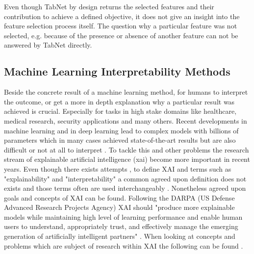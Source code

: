 \documentclass[../main.tex]{subfiles}
\begin{document}
Even though TabNet by design returns the selected features and their contribution to achieve a defined objective, it does not give an insight into the feature selection process itself. The question why a particular feature was not selected, e.g. because of the presence or absence of another feature can not be answered by TabNet directly. 

\newpage

\subsection{Machine Learning Interpretability Methods} \label{ssec:interpret_methods}

Beside the concrete result of a machine learning method, for humans to interpret the outcome, or get a more in depth explanation why a particular result was achieved is crucial. Especially for tasks in high stake domains like healthcare, medical research, security applications and many others. Recent developments in machine learning and in deep learning lead to complex models with billions of parameters which in many cases achieved state-of-the-art results but are also difficult or not at all to interpret \cite{linardatos_explainable_2021}.
To tackle this and other problems the research stream of explainable artificial intelligence (\acs{xai}) become more important in recent years. Even though there exists attempts \cite{palacio_xai_2021}, \cite{barredo_arrieta_explainable_2020} to define XAI and terms such as  "explainability" and "interpretability" a common agreed upon definition does not exists and those terms often are used interchangeably \cite{marcinkevics_interpretability_2020}. Nonetheless agreed upon goals and concepts of XAI can be found. Following the DARPA (US Defense Advanced Research Projects Agency) XAI should "produce more explainable models while maintaining high level of learning performance and enable human users to understand, appropriately trust, and effectively manage the emerging generation of artificially intelligent partners" \cite{darpa_xai}. 
When looking at concepts and problems which are subject of research within XAI the following can be found \cite{lipton_mythos_2017}.
\end{document}
